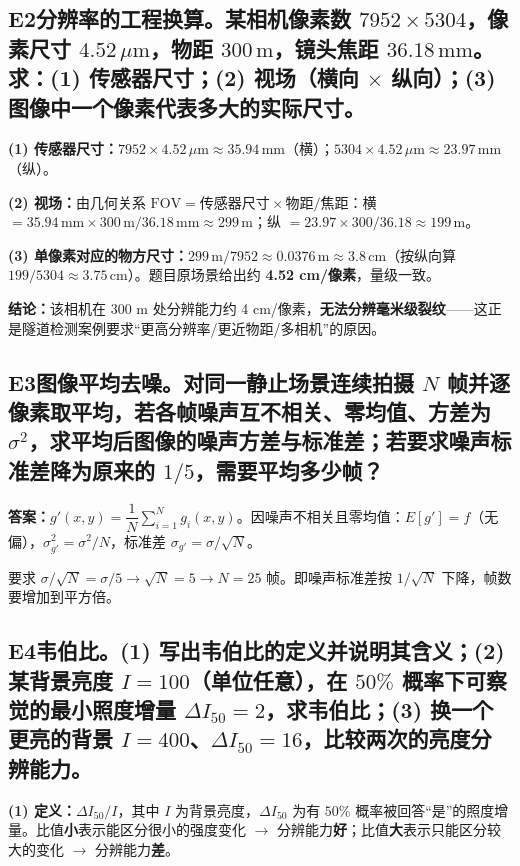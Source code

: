 \subsection*{E2\quad 分辨率的工程换算。某相机像素数 $7952\times5304$，像素尺寸 $4.52\,\mu\mathrm{m}$，物距 $300\,\mathrm{m}$，镜头焦距 $36.18\,\mathrm{mm}$。求：(1) 传感器尺寸；(2) 视场（横向 $\times$ 纵向）；(3) 图像中一个像素代表多大的实际尺寸。}
\textbf{(1) 传感器尺寸：}$7952\times4.52\,\mu\mathrm{m}\approx35.94\,\mathrm{mm}$（横）；$5304\times4.52\,\mu\mathrm{m}\approx23.97\,\mathrm{mm}$（纵）。

\textbf{(2) 视场：}由几何关系 $\mathrm{FOV}=\text{传感器尺寸}\times\text{物距}/\text{焦距}$：横 $=35.94\,\mathrm{mm}\times300\,\mathrm{m}/36.18\,\mathrm{mm}\approx299\,\mathrm{m}$；纵 $=23.97\times300/36.18\approx199\,\mathrm{m}$。

\textbf{(3) 单像素对应的物方尺寸：}$299\,\mathrm{m}/7952\approx0.0376\,\mathrm{m}\approx3.8\,\mathrm{cm}$（按纵向算 $199/5304\approx3.75\,\mathrm{cm}$）。题目原场景给出约 \textbf{4.52 cm/像素}，量级一致。

\textbf{结论：}该相机在 300 m 处分辨能力约 4 cm/像素，\textbf{无法分辨毫米级裂纹}——这正是隧道检测案例要求“更高分辨率/更近物距/多相机”的原因。

\subsection*{E3\quad 图像平均去噪。对同一静止场景连续拍摄 $N$ 帧并逐像素取平均，若各帧噪声互不相关、零均值、方差为 $\sigma^2$，求平均后图像的噪声方差与标准差；若要求噪声标准差降为原来的 $1/5$，需要平均多少帧？}
\textbf{答案：}$g'(x,y)=\dfrac{1}{N}\sum_{i=1}^{N}g_i(x,y)$。因噪声不相关且零均值：$E[g']=f$（无偏），$\sigma^2_{g'}=\sigma^2/N$，标准差 $\sigma_{g'}=\sigma/\sqrt{N}$。

要求 $\sigma/\sqrt{N}=\sigma/5\to\sqrt{N}=5\to N=25$ 帧。即噪声标准差按 $1/\sqrt{N}$ 下降，帧数要增加到平方倍。

\subsection*{E4\quad 韦伯比。(1) 写出韦伯比的定义并说明其含义；(2) 某背景亮度 $I=100$（单位任意），在 $50\%$ 概率下可察觉的最小照度增量 $\Delta I_{50}=2$，求韦伯比；(3) 换一个更亮的背景 $I=400$、$\Delta I_{50}=16$，比较两次的亮度分辨能力。}
\textbf{(1) 定义：}$\Delta I_{50}/I$，其中 $I$ 为背景亮度，$\Delta I_{50}$ 为有 $50\%$ 概率被回答“是”的照度增量。比值\textbf{小}表示能区分很小的强度变化 $\to$ 分辨能力\textbf{好}；比值\textbf{大}表示只能区分较大的变化 $\to$ 分辨能力\textbf{差}。

